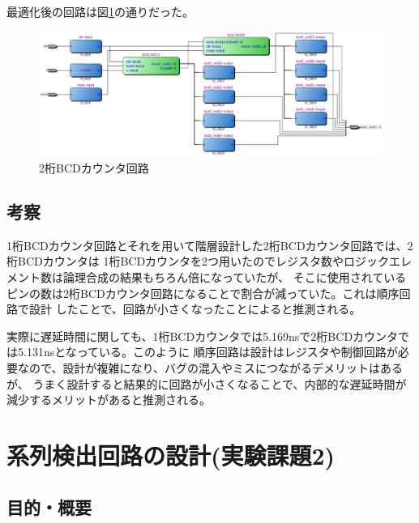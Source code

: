 \documentclass[uplatex]{jsarticle}
\begin{document}
最適化後の回路は図\ref{fig:22}の通りだった。

\begin{figure}[htb]
  \begin{center}
    \includegraphics[width=13cm]{images/fig22.eps}
    \caption{2桁BCDカウンタ回路}
    \label{fig:22}
  \end{center}
\end{figure}

\subsection{考察}

1桁BCDカウンタ回路とそれを用いて階層設計した2桁BCDカウンタ回路では、2桁BCDカウンタは
1桁BCDカウンタを2つ用いたのでレジスタ数やロジックエレメント数は論理合成の結果もちろん倍になっていたが、
そこに使用されているピンの数は2桁BCDカウンタ回路になることで割合が減っていた。これは順序回路で設計
したことで、回路が小さくなったことによると推測される。

実際に遅延時間に関しても、1桁BCDカウンタでは5.169nsで2桁BCDカウンタでは5.131nsとなっている。このように
順序回路は設計はレジスタや制御回路が必要なので、設計が複雑になり、バグの混入やミスにつながるデメリットはあるが、
うまく設計すると結果的に回路が小さくなることで、内部的な遅延時間が減少するメリットがあると推測される。

\clearpage

\section{系列検出回路の設計(実験課題2)}

\subsection{目的・概要}
\end{document}
